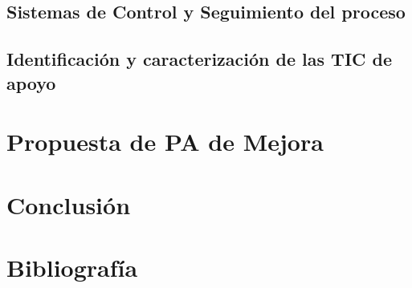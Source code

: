 	\subsection{Sistemas de Control y Seguimiento del proceso}
	\subsection{Identificación y caracterización de las TIC de apoyo}
\section{Propuesta de PA de Mejora}
\section{Conclusión}
\section{Bibliografía}

	

